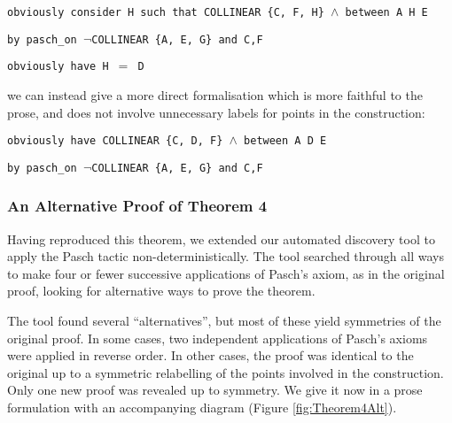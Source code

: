 \vspace{0.5cm}
\begin{minipage}{\linewidth}
  \footnotesize
  \texttt{obviously consider H such that COLLINEAR \{C, F, H\} $\wedge$ between A H E}

  \texttt{\qquad\qquad by pasch\_on $\neg$COLLINEAR \{A, E, G\} and C,F}

  \texttt{obviously have H $=$ D}
\end{minipage}
\vspace{0.5cm}

\noindent we can instead give a more direct formalisation which is more faithful to the prose, and does not involve unnecessary labels for points in the construction:

\vspace{0.5cm}
\begin{minipage}{\linewidth}
  \footnotesize
  \texttt{obviously have COLLINEAR \{C, D, F\} $\wedge$ between A D E}

  \texttt{\qquad\qquad by pasch\_on $\neg$COLLINEAR \{A, E, G\} and C,F}
\end{minipage}
\vspace{0.5cm}

\subsubsection{An Alternative Proof of Theorem 4}\label{sec:Theorem4Alt}
Having reproduced this theorem, we extended our automated discovery tool to apply the Pasch tactic non-deterministically. The tool searched through all ways to make four or fewer successive applications of Pasch's axiom, as in the original proof, looking for alternative ways to prove the theorem.

The tool found several ``alternatives'', but most of these yield symmetries of the original proof. In some cases, two independent applications of Pasch's axioms were applied in reverse order. In other cases, the proof was identical to the original up to a symmetric relabelling of the points involved in the construction. Only one new proof was revealed up to symmetry. We give it now in a prose formulation with an accompanying diagram (Figure \ref{fig:Theorem4Alt}).


